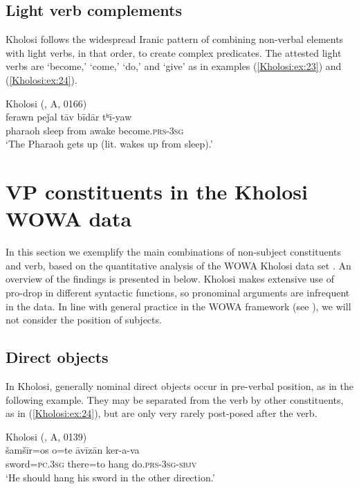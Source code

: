 \documentclass[output=paper,colorlinks,citecolor=brown]{langscibook}
\begin{document}
\subsection{Light verb complements}\label{Kholosi:ss:3.8}

Kholosi follows the widespread Iranic  pattern of combining non-verbal elements with light verbs, in that order, to create complex predicates. The attested light verbs are `become,' `come,' `do,' and `give' as in examples (\ref{Kholosi:ex:23}) and (\ref{Kholosi:ex:24}).

\ea\label{Kholosi:ex:23}
Kholosi (\citealt{nourzaei_kholosi_2022}, A, 0166)\\
\gll ferawn peǰal tāv bīdār tʰī-yaw \\
pharaoh sleep from awake become\textsc{.prs-3sg} \\
\glt `The Pharaoh gets up (lit. wakes up from sleep).' 
\z

\section{VP constituents in the Kholosi WOWA data}\label{Kholosi:ss:4}

\begin{sloppypar}
In this section we exemplify the main combinations of non-subject constituents and verb, based on the quantitative analysis of the WOWA Kholosi data set \citep{nourzaei_kholosi_2022}. An overview of the findings is presented in  below. Kholosi makes extensive use of pro-drop in different syntactic functions, so pronominal arguments are infrequent in the data. In line with general practice in the WOWA framework (see ), we will not consider the position of subjects.
\end{sloppypar}

\subsection{Direct objects}\label{Kholosi:ss:4.1}

In Kholosi, generally nominal direct objects occur in pre-verbal position, as in the following example. They may be separated from the verb by other constituents, as in (\ref{Kholosi:ex:24}), but are only very rarely post-posed after the verb.


\newpage
\ea\label{Kholosi:ex:24}
Kholosi (\citealt{nourzaei_kholosi_2022}, A, 0139)\\
\gll šamšīr=os o=te āvīzān ker-a-va \\
sword\textsc{=pc.3sg} there=to hang do\textsc{.prs-3sg-sbjv} \\
\glt `He should hang his sword in the other direction.' 
\z
\end{document}
